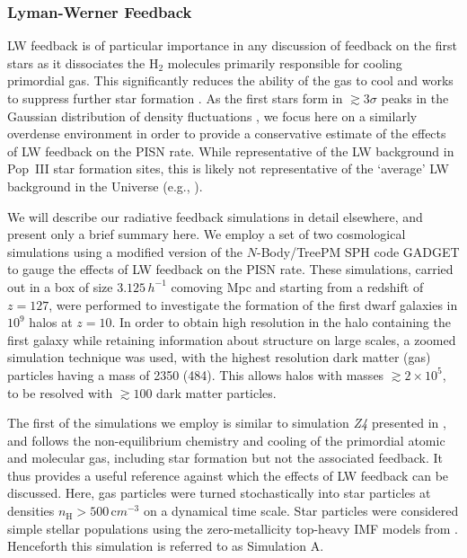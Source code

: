 \documentclass[../thesis.tex]{subfiles}
\begin{document}
\subsubsection{Lyman-Werner Feedback}
\label{lymanWerner}
LW feedback is of particular importance in any discussion of feedback
on the first stars as it dissociates the H$_2$ molecules primarily
responsible for cooling primordial gas.  This significantly reduces
the ability of the gas to cool and works to suppress further star
formation \citep{HaimanReesLoeb1997, OmukaiNishi1999,
  CiardiFerraraAbel2000, HaimanAbelRees2000, GloverBrand2001,
  Kitayamaetal2001, MachacekBryanAbel2001, RicottiGnedinShull2001,
  RicottiGnedinShull2002a, RicottiGnedinShull2002b, Yoshidaetal2003,
  OmukaiYoshii2003, MesingerBryanHaiman2006}.  As the first stars form
in $\gtrsim 3\sigma$ peaks in the Gaussian distribution of density
fluctuations \citep{BarkanaLoeb2001}, we focus here on a similarly
overdense environment in order to provide a conservative estimate of
the effects of LW feedback on the PISN rate.  While representative of
the LW background in Pop~III star formation sites, this is likely not
representative of the `average' LW background in the Universe (e.g.,
\citealt{MachacekBryanAbel2001, MesingerBryanHaiman2006}).

We will describe our radiative feedback simulations in detail
elsewhere, and present only a brief summary here.  We employ a set of
two cosmological simulations using a modified version of the
$N$-Body/TreePM SPH code GADGET \citep{Springel2005,Springeletal2001}
to gauge the effects of LW feedback on the PISN rate. These
simulations, carried out in a box of size $3.125 \,h^{-1}$ comoving
Mpc and starting from a redshift of $z=127$, were performed to
investigate the formation of the first dwarf galaxies in $10^9$\msun
halos at $z=10$. In order to obtain high resolution in the halo
containing the first galaxy while retaining information about
structure on large scales, a zoomed simulation technique was used,
with the highest resolution dark matter (gas) particles having a mass
of 2350 (484)\msun. This allows halos with masses $\gtrsim 2
\times 10^5$\msun, to be resolved with $\gtrsim 100$ dark
matter particles.

The first of the simulations we employ is similar to simulation \textit{Z4} 
presented in \citet{PawlikMilosavljevicBromm2011}, and follows
the non-equilibrium chemistry and cooling of the primordial atomic and
molecular gas, including star formation but not the associated
feedback.  It thus provides a useful reference against which the
effects of LW feedback can be discussed. Here, gas particles were
turned stochastically into star particles at densities $n_{\mathrm H} >
500 \,{\mathrm cm}^{-3}$ on a dynamical time scale. Star particles were
considered simple stellar populations using the zero-metallicity
top-heavy IMF models from \citet{Schaerer2003}.  Henceforth this
simulation is referred to as Simulation A.
\end{document}
